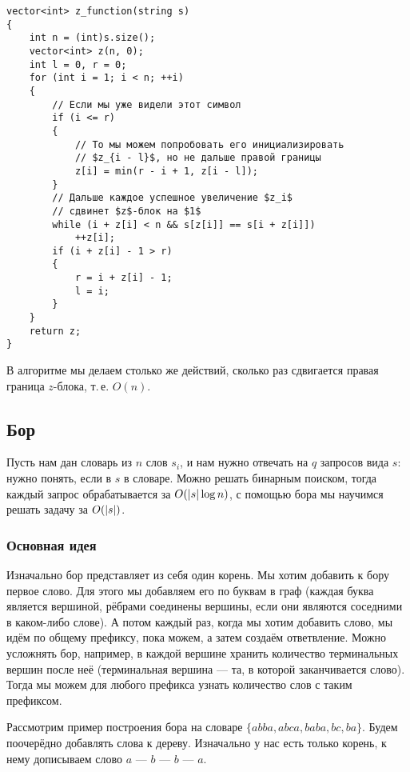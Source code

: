 \begin{verbatim}
vector<int> z_function(string s)
{
    int n = (int)s.size();
    vector<int> z(n, 0);
    int l = 0, r = 0;
    for (int i = 1; i < n; ++i)
    {
        // Если мы уже видели этот символ
        if (i <= r)
        {
            // То мы можем попробовать его инициализировать
            // $z_{i - l}$, но не дальше правой границы
            z[i] = min(r - i + 1, z[i - l]);
        }
        // Дальше каждое успешное увеличение $z_i$
        // сдвинет $z$-блок на $1$
        while (i + z[i] < n && s[z[i]] == s[i + z[i]])
            ++z[i];
        if (i + z[i] - 1 > r)
        {
            r = i + z[i] - 1;
            l = i;
        }
    }
    return z;
}
\end{verbatim}

В алгоритме мы делаем столько же действий, сколько раз сдвигается правая граница $z$-блока, т.\,е. $O(n)$.

\subsection{Бор}

\begin{problem}
    Пусть нам дан словарь из $n$ слов $s_i$, и нам нужно отвечать на $q$ запросов вида $s$: нужно понять, если в $s$ в словаре. Можно решать бинарным поиском, тогда каждый запрос обрабатывается за $O(\left\lvert s\right\rvert\log n)$, с помощью бора мы научимся решать задачу за $O(\left\lvert s\right\rvert)$.
\end{problem}

\subsubsection{Основная идея}

Изначально бор представляет из себя один корень. Мы хотим добавить к бору первое слово. Для этого мы добавляем его по буквам в граф (каждая буква является вершиной, рёбрами соединены вершины, если они являются соседними в каком-либо слове). А потом каждый раз, когда мы хотим добавить слово, мы идём по общему префиксу, пока можем, а затем создаём ответвление. Можно усложнять бор, например, в каждой вершине хранить количество терминальных вершин после неё (терминальная вершина --- та, в которой заканчивается слово). Тогда мы можем для любого префикса узнать количество слов с таким префиксом.

Рассмотрим пример построения бора на словаре $\{abba, abca, baba, bc, ba\}$. Будем поочерёдно добавлять слова к дереву. Изначально у нас есть только корень, к нему дописываем слово $a$ --- $b$ --- $b$ --- $a$.

